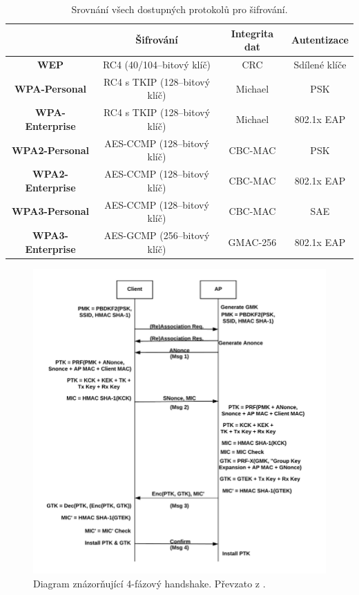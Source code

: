 \begin{table}[htb]
\centering
\begin{tabular}{|c|c|c|c|}
\hline
\textbf{}                & \textbf{Šifrování}           & \textbf{Integrita dat} & \textbf{Autentizace}                        \\ \hline
\textbf{WEP}             & RC4 (40/104–bitový klíč)     & CRC                    & Sdílené klíče                     \\ \hline
\textbf{WPA-Personal}    & RC4 s TKIP (128–bitový klíč) & Michael                & PSK                     \\ \hline
\textbf{WPA-Enterprise}  & RC4 s TKIP (128–bitový klíč) & Michael                & 802.1x EAP                       \\ \hline
\textbf{WPA2-Personal}   & AES-CCMP (128–bitový klíč)   & CBC-MAC                & PSK                    \\ \hline
\textbf{WPA2-Enterprise} & AES-CCMP (128–bitový klíč)   & CBC-MAC                & 802.1x EAP                       \\ \hline
\textbf{WPA3-Personal}   & AES-CCMP (128–bitový klíč)   & CBC-MAC                & SAE \\ \hline
\textbf{WPA3-Enterprise} & AES-GCMP (256–bitový klíč)   & GMAC-256           & 802.1x EAP      \\ \hline
\end{tabular}
\caption{Srovnání všech dostupných protokolů pro šifrování.}
\label{table:wpa-compare}
\end{table}

\begin{figure}[htbp]
  \centering
  \includegraphics[width=15cm]{obrazky-figures/handshake.png}
  \caption{Diagram znázorňující 4-fázový handshake. Převzato z \cite{kohlios2018comprehensive}.}
  \label{img:handshake}
\end{figure}

